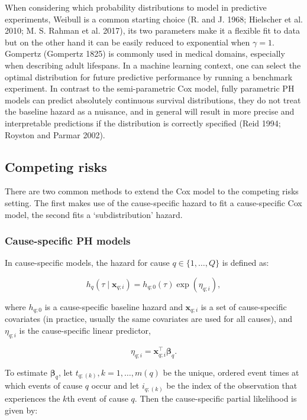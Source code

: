 \documentclass[
  letterpaper,
  krantz2]{style/krantz}
\begin{document}
When considering which probability distributions to model in predictive
experiments, Weibull is a common starting choice (R. and J. 1968;
Hielscher et al. 2010; M. S. Rahman et al. 2017), its two parameters
make it a flexible fit to data but on the other hand it can be easily
reduced to exponential when \(\gamma=1\). Gompertz (Gompertz 1825) is
commonly used in medical domains, especially when describing adult
lifespans. In a
machine learning context, one can select the optimal distribution for
future predictive performance by running a benchmark experiment. In
contrast to the semi-parametric Cox model, fully parametric PH models
can predict absolutely continuous survival distributions, they do not
treat the baseline hazard as a nuisance, and in general will result in
more precise and interpretable predictions if the distribution is
correctly specified (Reid 1994; Royston and Parmar 2002).

\subsection{Competing risks}\label{sec-classical-ph-cr}

There are two common methods to extend the Cox model to the competing
risks setting. The first makes use of the
cause-specific hazard to fit a cause-specific Cox model, the second fits
a `subdistribution'
hazard.

\subsubsection{Cause-specific PH models}\label{cause-specific-ph-models}

In cause-specific models, the hazard for cause \(q \in \{1,\ldots,Q\}\)
is defined as:

\[
h_{q}(\tau \mid \mathbf{x}_{q;i})= h_{q;0}(\tau)\exp(\eta_{q;i}),
\]

where \(h_{q;0}\) is a cause-specific baseline hazard and
\(\mathbf{x}_{q;i}\) is a set of cause-specific covariates (in practice,
usually the same covariates are used for all causes), and \(\eta_{q;i}\)
is the cause-specific linear predictor,

\[
\eta_{q;i} = \mathbf{x}_{q;i}^\top\boldsymbol{\beta}_q.
\]

To estimate \(\boldsymbol{\beta}_q\), let \(t_{q;(k)}, k=1,\ldots,m(q)\)
be the unique, ordered event times at which events of cause \(q\) occur
and let \(i_{q;(k)}\) be the index of the observation that experiences
the \(k\)th event of cause \(q\). Then the cause-specific partial
likelihood is given by:
\end{document}
